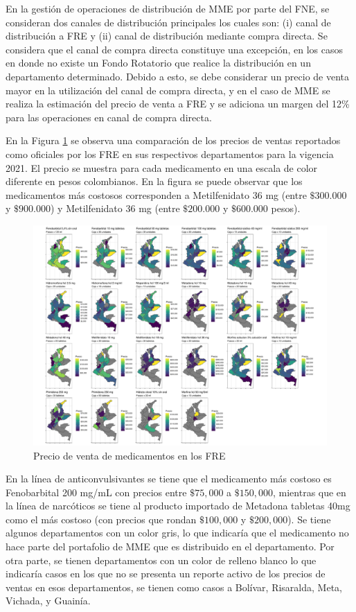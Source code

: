 \documentclass[
]{book}
\begin{document}
En la gestión de operaciones de distribución de MME por parte del FNE, se consideran dos canales de distribución principales los cuales son: (i) canal de distribución a FRE y (ii) canal de distribución mediante compra directa. Se considera que el canal de compra directa constituye una excepción, en los casos en donde no existe un Fondo Rotatorio que realice la distribución en un departamento determinado. Debido a esto, se debe considerar un precio de venta mayor en la utilización del canal de compra directa, y en el caso de MME se realiza la estimación del precio de venta a FRE y se adiciona un margen del 12\% para las operaciones en canal de compra directa.

En la Figura \ref{fig:precioVentasDepartamentos} se observa una comparación de los precios de ventas reportados como oficiales por los FRE en sus respectivos departamentos para la vigencia 2021. El precio se muestra para cada medicamento en una escala de color diferente en pesos colombianos. En la figura se puede observar que los medicamentos más costosos corresponden a Metilfenidato 36 mg (entre \(\$300.000\) y \(\$900.000\)) y Metilfenidato 36 mg (entre \(\$200.000\) y \(\$600.000\) pesos).

\begin{figure}[t!]
\includegraphics[width=1\linewidth]{InformeFinal_files/figure-latex/precioVentasDepartamentos-1} \caption{Precio de venta de medicamentos en los FRE}\label{fig:precioVentasDepartamentos}
\end{figure}

En la línea de anticonvulsivantes se tiene que el medicamento más costoso es Fenobarbital 200 mg/mL con precios entre \(\$75,000\) a \(\$150,000\), mientras que en la línea de narcóticos se tiene al producto importado de Metadona tabletas 40mg como el más costoso (con precios que rondan \(\$100,000\) y \(\$200,000\)). Se tiene algunos departamentos con un color gris, lo que indicaría que el medicamento no hace parte del portafolio de MME que es distribuido en el departamento. Por otra parte, se tienen departamentos con un color de relleno blanco lo que indicaría casos en los que no se presenta un reporte activo de los precios de ventas en esos departamentos, se tienen como casos a Bolívar, Risaralda, Meta, Vichada, y Guainía.
\end{document}
